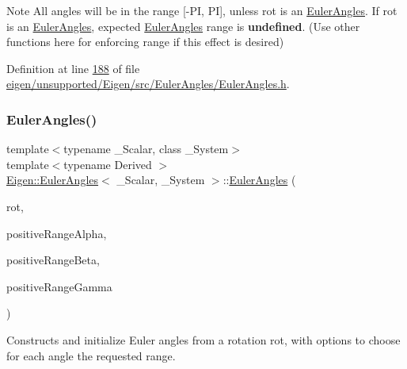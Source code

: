 \begin{DoxyNote}{Note}
All angles will be in the range \mbox{[}-\/\+PI, PI\mbox{]}, unless {\ttfamily rot} is an \hyperlink{class_eigen_1_1_euler_angles}{Euler\+Angles}. If rot is an \hyperlink{class_eigen_1_1_euler_angles}{Euler\+Angles}, expected \hyperlink{class_eigen_1_1_euler_angles}{Euler\+Angles} range is {\bfseries undefined}. (Use other functions here for enforcing range if this effect is desired) 
\end{DoxyNote}


Definition at line \hyperlink{eigen_2unsupported_2_eigen_2src_2_euler_angles_2_euler_angles_8h_source_l00188}{188} of file \hyperlink{eigen_2unsupported_2_eigen_2src_2_euler_angles_2_euler_angles_8h_source}{eigen/unsupported/\+Eigen/src/\+Euler\+Angles/\+Euler\+Angles.\+h}.

\mbox{\label{class_eigen_1_1_euler_angles_aeaf9524ff49ee720786e78f44c23cc17}} 
\subsubsection{\texorpdfstring{Euler\+Angles()}{EulerAngles()}\hspace{0.1cm}{\footnotesize\ttfamily [6/12]}}
{\footnotesize\ttfamily template$<$typename \+\_\+\+Scalar, class \+\_\+\+System$>$ \\
template$<$typename Derived $>$ \\
\hyperlink{class_eigen_1_1_euler_angles}{Eigen\+::\+Euler\+Angles}$<$ \+\_\+\+Scalar, \+\_\+\+System $>$\+::\hyperlink{class_eigen_1_1_euler_angles}{Euler\+Angles} (\begin{DoxyParamCaption}\item[{const \hyperlink{class_eigen_1_1_rotation_base}{Rotation\+Base}$<$ Derived, 3 $>$ \&}]{rot,  }\item[{bool}]{positive\+Range\+Alpha,  }\item[{bool}]{positive\+Range\+Beta,  }\item[{bool}]{positive\+Range\+Gamma }\end{DoxyParamCaption})\hspace{0.3cm}{\ttfamily [inline]}}

Constructs and initialize Euler angles from a rotation {\ttfamily rot}, with options to choose for each angle the requested range.


